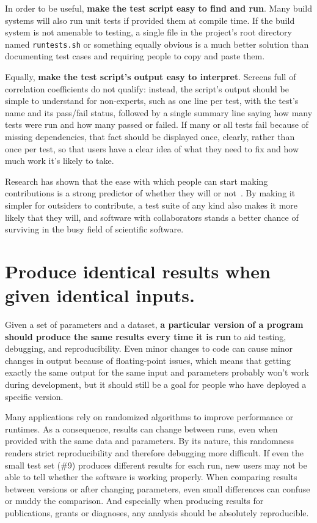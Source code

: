 \documentclass[10pt,letterpaper]{article}
\begin{document}
In order to be useful, \textbf{make the test script easy to find and run}. 
Many build systems will also run unit tests if provided them at compile time.
If the build system is not amenable to testing, a 
single file in the project's root directory named \texttt{runtests.sh}
or something equally obvious is a much better solution than documenting
test cases and requiring people to copy and paste them.

Equally, \textbf{make the test script's output easy to interpret}. Screens
full of correlation coefficients do not qualify: instead, the script's
output should be simple to understand for non-experts,
such as one line per test, with the test's name
and its pass/fail status, followed by a single summary line saying how
many tests were run and how many passed or failed. If many or all tests
fail because of missing dependencies, that fact should be displayed
once, clearly, rather than once per test, so that users have a clear
idea of what they need to fix and how much work it's likely to take.

Research has shown that the ease with which people can start making
contributions is a strong predictor of whether they will or not~\cite{steinmacher2015}.
By making it simpler for outsiders to contribute,
a test suite of any kind also makes it more likely that they will, and software
with collaborators stands a better chance of surviving in the busy field of
scientific software.

\section{Produce identical results when given identical inputs.}

Given a set of parameters and a dataset, \textbf{a particular version of a program
should produce the same results every time it is run}
to aid testing, debugging, and reproducibility.
Even minor changes to code can cause minor changes in output because of floating-point issues,
which means that getting exactly the same output for the same input and parameters
probably won't work during development,
but it should still be a goal for people who have deployed a specific version.

Many applications rely on randomized algorithms to
improve performance or runtimes. As a consequence, results can change
between runs, even when provided with the same data and parameters. By
its nature, this randomness renders strict reproducibility and therefore
debugging more difficult. If even the small test set (\#9) produces
different results for each run, new users may not be able to tell whether the software is
working properly. When comparing
results between versions or after changing parameters, even small
differences can confuse or muddy the comparison. And especially when
producing results for publications, grants or diagnoses, any analysis
should be absolutely reproducible.
\end{document}
